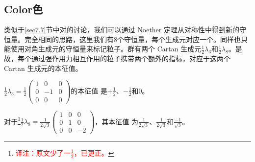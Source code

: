 \subsection[色]{Color\quad 色}\label{sec7.8.1}
类似于\ref{sec7.7}节中对\sutw 的讨论，我们可以通过 Noether 定理从\suth 对称性中得到新的守恒量。完全相同的思路，这里我们有$8$个守恒量，每个生成元对应一个。同样也只能使用对角生成元的守恒量来标记粒子。\suth 群有两个 Cartan 生成元$\frac{1}{2}\lambda_3$和$\frac{1}{2} \lambda_8$。是故，每个通过强作用力相互作用的粒子携带两个额外的指标，对应于这两个 Cartan 生成元的本征值。

$\frac{1}{2}\lambda_3=\frac{1}{2} \begin{pmatrix}
1 & 0 & 0 \\ 0 & -1 & 0 \\ 0 & 0 & 0
\end{pmatrix}$的本征值%
%
是$+\frac{1}{2}$、$-\frac{1}{2}$和$0$。

对于\footnote{\textcolor{red}{译注：原文少了一$\frac{1}{2}$，已更正。}}$\frac{1}{2}\lambda_8= \frac{1}{2\sqrt{3}}\begin{pmatrix}
1 & 0 & 0 \\ 0 & 1 & 0 \\ 0 & 0 & -2
\end{pmatrix}$，其本征值%
%
为$\frac{1}{2\sqrt{3}}$、$\frac{1}{2\sqrt{3}}$和$\frac{-1}{\sqrt{3}}$。

